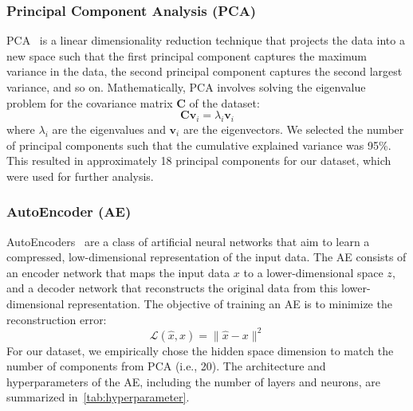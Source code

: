 \documentclass{article} %
\begin{document}
\subsubsection{Principal Component Analysis (PCA)}
PCA~\citep{pearson1901pca,hotelling1933pca} is a linear dimensionality reduction technique that projects the data into a new space such that the first principal component captures the maximum variance in the data, the second principal component captures the second largest variance, and so on. Mathematically, PCA involves solving the eigenvalue problem for the covariance matrix \( \mathbf{C} \) of the dataset:
$$
\mathbf{C} \mathbf{v}_i = \lambda_i \mathbf{v}_i
$$
where \( \lambda_i \) are the eigenvalues and \( \mathbf{v}_i \) are the eigenvectors. 
We selected the number of principal components such that the cumulative explained variance was 95\%.
This resulted in approximately 18 principal components for our dataset, which were used for further analysis.

\subsubsection{AutoEncoder (AE)}
AutoEncoders~\citep{hinton2006autoencoder,goodfellow2016deep} are a class of artificial neural networks that aim to learn a compressed, low-dimensional representation of the input data. The AE consists of an encoder network that maps the input data \( x \) to a lower-dimensional space \( z \), and a decoder network that reconstructs the original data from this lower-dimensional representation. The objective of training an AE is to minimize the reconstruction error:
$$
\mathcal{L}(\hat{x}, x) = \| \hat{x} - x \|^2
$$
For our dataset, we empirically chose the hidden space dimension to match the number of components from PCA (i.e., 20). The architecture and hyperparameters of the AE, including the number of layers and neurons, are summarized in~\autoref{tab:hyperparameter}.
\end{document}
